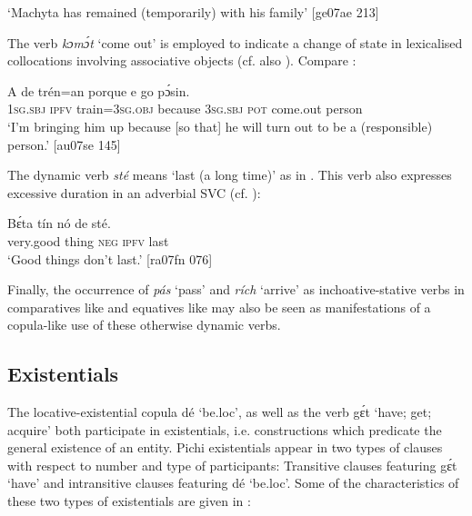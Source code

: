 \glt ‘Machyta has remained (temporarily) with his family’ [ge07ae 213] 
\z

The verb \textit{kɔmɔ́t} ‘come out’ is employed to indicate a change of state in lexicalised collocations involving associative objects (cf. also ). Compare :


\ea%
    \label{ex:key:802}
    \gll \MakeUppercase{A}   de  trén=an    porque  e    go      pɔ́sin.\\
\textsc{1sg.sbj}  \textsc{ipfv}  train=\textsc{3sg.obj}  because  \textsc{3sg.sbj}  \textsc{pot}  come.out  person\\

\glt ‘I’m bringing him up because [so that] he will turn out to be a (responsible) 
person.’ [au07se 145]
\z

The dynamic verb \textit{sté} means ‘last (a long time)’ as in . This verb also expresses excessive duration in an adverbial SVC (cf. ):


\ea%
    \label{ex:key:803}
    \gll Bɛ́ta      tín    nó  de  sté.\\
very.good  thing  \textsc{neg}  \textsc{ipfv}  last\\

\glt ‘Good things don’t last.’ [ra07fn 076]
\z

Finally, the occurrence of \textit{pás} ‘pass’ and \textit{rích} ‘arrive’ as inchoative-stative verbs in comparatives like  and equatives like  may also be seen as manifestations of a copula-like use of these otherwise dynamic verbs. 

\subsection{Existentials}\label{sec:7.6.3}

The locative-existential copula{\fff} dé ‘be.loc’, as well as the verb gɛ́t ‘have; get; acquire’ both participate in existentials, i.e. constructions which predicate the general existence of an entity. Pichi existentials appear in two types of clauses with respect to number and type of participants: Transitive clauses featuring gɛ́t ‘have’ and intransitive clauses featuring dé ‘be.loc’. Some of the characteristics of these two types of existentials are given in :

